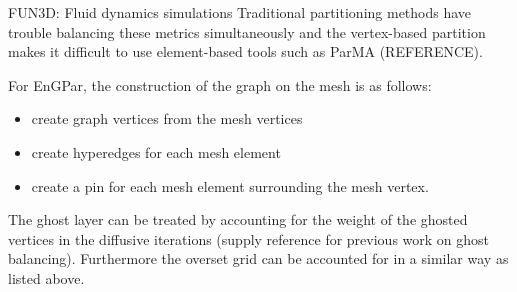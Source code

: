 \documentclass{beamer}
\begin{document}
\begin{textblock}{15.6}
\begin{textblock}{5}
\begin{block}{FUN3D: Fluid dynamics simulations}
      Traditional partitioning methods have trouble balancing these metrics simultaneously and the vertex-based partition makes it difficult to use element-based tools such as ParMA (REFERENCE).


      For EnGPar, the construction of the graph on the mesh is as follows:
      \begin{itemize}
      \item create graph vertices from the mesh vertices
      \item create hyperedges for each mesh element
      \item create a pin for each mesh element surrounding the mesh vertex.
      \end{itemize}

      The ghost layer can be treated by accounting for the weight of the ghosted vertices in the diffusive iterations (supply reference for previous work on ghost balancing). Furthermore the overset grid can be accounted for in a similar way as listed above.

      
    \end{block}
  \end{textblock}
\end{textblock}
\end{document}
